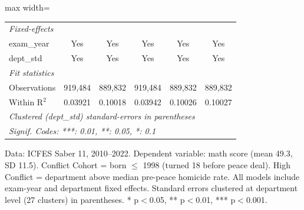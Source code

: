 \begin{table}[htbp]
\begin{adjustbox}{max width=\textwidth}
\begin{tabular}{lccccc}
      \midrule
      \emph{Fixed-effects}\\
      exam\_year                                                  & Yes            & Yes            & Yes            & Yes            & Yes\\  
      dept\_std                                                   & Yes            & Yes            & Yes            & Yes            & Yes\\  
      \midrule
      \emph{Fit statistics}\\
      Observations                                                & 919,484        & 889,832        & 919,484        & 889,832        & 889,832\\  
      Within R$^2$                                                & 0.03921        & 0.10018        & 0.03942        & 0.10026        & 0.10027\\  
      \midrule \midrule
      \multicolumn{6}{l}{\emph{Clustered (dept\_std) standard-errors in parentheses}}\\
      \multicolumn{6}{l}{\emph{Signif. Codes: ***: 0.01, **: 0.05, *: 0.1}}\\
   \end{tabular}
   \end{adjustbox}

   \par \raggedright 
   Data: ICFES Saber 11, 2010--2022. Dependent variable: math score (mean 49.3, SD 11.5). Conflict Cohort = born $\leq$ 1998 (turned 18 before peace deal). High Conflict = department above median pre-peace homicide rate. All models include exam-year and department fixed effects. Standard errors clustered at department level (27 clusters) in parentheses. * p$<$0.05, ** p$<$0.01, *** p$<$0.001.
\end{table}


